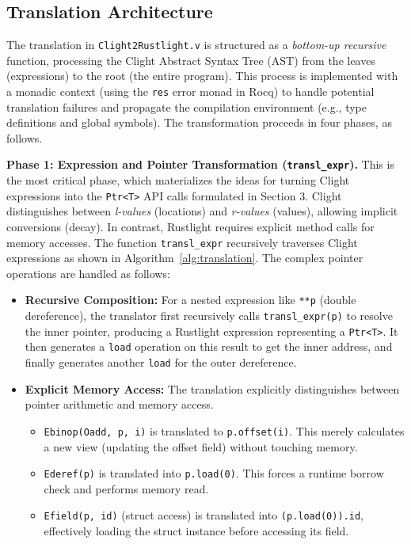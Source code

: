 \documentclass{llncs} %
\begin{document}
\subsection{Translation Architecture}

The translation in \texttt{Clight2Rustlight.v} is structured as a \emph{bottom-up recursive} function, processing the Clight Abstract Syntax Tree (AST) from the leaves (expressions) to the root (the entire program). This process is implemented with a monadic context (using the \texttt{res} error monad in Rocq) to handle potential translation failures and propagate the compilation environment (e.g., type definitions and global symbols).
%
The transformation proceeds in four phases, as follows.

\textbf{Phase 1: Expression and Pointer Transformation (\texttt{transl\_expr}).}
%
This is the most critical phase, which materializes the ideas for turning Clight expressions into the \texttt{Ptr<T>} API calls formulated in Section 3. Clight distinguishes between \textit{l-values} (locations) and \textit{r-values} (values), allowing implicit conversions (decay). In contrast, Rustlight requires explicit method calls for memory accesses.
%
The function \texttt{transl\_expr} recursively traverses Clight expressions as shown in Algorithm~\ref{alg:translation}. The complex pointer operations are handled as follows:
\begin{itemize}
    \item \textbf{Recursive Composition:} For a nested expression like \texttt{**p} (double dereference), the translator first recursively calls \texttt{transl\_expr(p)} to resolve the inner pointer, producing a Rustlight expression representing a \texttt{Ptr<T>}. It then generates a \texttt{load} operation on this result to get the inner address, and finally generates another \texttt{load} for the outer dereference.
    \item \textbf{Explicit Memory Access:} The translation explicitly distinguishes between pointer arithmetic and memory access.
    \begin{itemize}
        \item \texttt{Ebinop(Oadd, p, i)} is translated to \texttt{p.offset(i)}. This merely calculates a new view (updating the offset field) without touching memory.
        \item \texttt{Ederef(p)} is translated into \texttt{p.load(0)}. This forces a runtime borrow check and performs memory read.
        \item \texttt{Efield(p, id)} (struct access) is translated into \texttt{(p.load(0)).id}, effectively loading the struct instance before accessing its field.
    \end{itemize}
\end{itemize}
\end{document}
